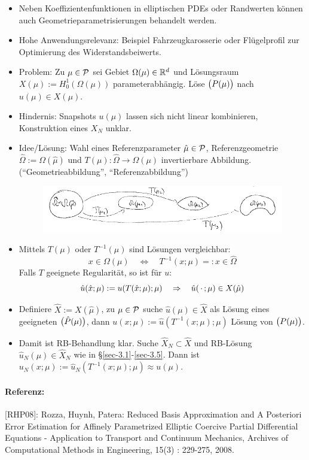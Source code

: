 \begin{itemize}
	\item Neben Koeffizientenfunktionen in elliptischen PDEs oder Randwerten können auch Geometrieparametrisierungen behandelt werden.
	\item Hohe Anwendungsrelevanz: Beispiel Fahrzeugkarosserie oder Flügelprofil zur Optimierung des Widerstandsbeiwerts.
	\item Problem: Zu $\mu \in \mathcal{P}$ sei Gebiet $\Omega(\mu) \in \mathbb{R}^d$ und Lösungsraum $X(\mu) := H_0^1(\Omega(\mu))$ parameterabhängig. Löse $\big(P(\mu)\big)$ nach $u(\mu) \in X(\mu)$.
	\item Hindernis: Snapshots $u(\mu)$ lassen sich nicht linear kombinieren, Konstruktion eines $X_N$ unklar.
	\item Idee/Lösung: Wahl eines Referenzparameter $\hat\mu \in \mathcal{P}$, Referenzgeometrie $\hat\Omega := \Omega(\hat\mu)$ und $T(\mu) : \hat\Omega \to \Omega(\mu)$ invertierbare Abbildung. (``Geometrieabbildung'', ``Referenzabbildung'')
		\begin{figure}[H]
			\centering\small
			\includegraphics[width = 0.75 \textwidth]{Bilder/ref-abb.png}
		\end{figure}
	\item Mittels $T(\mu)$ oder $T^{-1}(\mu)$ sind Lösungen vergleichbar:
		\[
			x \in \Omega(\mu) \quad \Leftrightarrow \quad T^{-1}(x;\mu) =: \hat x \in \hat\Omega
		\]
		Falls $T$ geeignete Regularität, so ist für $u$:
		\[
			\hat u(\hat x; \mu) := u(T(\hat x;\mu);\mu) \quad \Rightarrow \quad \hat u(\,\cdot\,;\mu) \in X(\hat \mu)
		\]
	\item Definiere $\hat X := X(\hat \mu)$, zu $\mu \in \mathcal{P}$ suche $\hat u(\mu) \in \hat X$ als Lösung eines geeigneten $\big(\hat P(\mu)\big)$, dann $u(x;\mu) := \hat u(T^{-1}(x;\mu);\mu)$ Lösung von $\big(P(\mu)\big)$.
	\item Damit ist RB-Behandlung klar.
		Suche $\hat X_N \subset \hat X$ und RB-Lösung $\hat u_N(\mu) \in \hat X_N$ wie in §\ref{sec-3.1}-\ref{sec-3.5}.
		Dann ist $u_N(x;\mu) := \hat u_N(T^{-1}(x;\mu);\mu) \approx u(\mu)$.
\end{itemize}

\paragraph{Referenz:} [RHP08]: Rozza, Huynh, Patera: Reduced Basis Approximation and A Posteriori Error Estimation for Affinely Parametrized Elliptic Coercive Partial Differential Equations - Application to Transport and Continuum Mechanics, Archives of Computational Methods in Engineering, 15(3) : 229-275, 2008.

